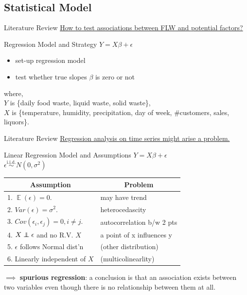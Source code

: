 \documentclass{beamer}
\newcommand\independent{\protect\mathpalette{\protect\independenT}{\perp}}
\def\independenT#1#2{\mathrel{\rlap{$#1#2$}\mkern2mu{#1#2}}}
\begin{document}
\subsection{Statistical Model}
\begin{frame}{Literature Review}
    \underline{How to test associations between FLW and potential factors?}
    \begin{block}{Regression Model and Strategy}
        \centering$Y = X\beta + \epsilon$\\
        \begin{itemize}
            \item set-up regression model
            \item test whether true slopes $\beta$ is zero or not
        \end{itemize}
    \end{block}
    where,\\
        $Y$ is \{daily food waste, liquid waste, solid waste\},\\
        $X$ is \{temperature, humidity, precipitation, day of week, \#customers, sales, liquors\}.
\end{frame}

\begin{frame}{Literature Review}
    \underline{Regression analysis on time series might arise a problem.}
    \begin{block}{Linear Regression Model and Assumptions}
        \centering $Y = X\beta + \epsilon$\\
        \centering $\epsilon \overset{\text{i.i.d.}}{\sim} N(0, \sigma^2)$
        \small
        \begin{tabular}{ll}
            \hline
            \multicolumn{1}{c}{Assumption} & \multicolumn{1}{c}{Problem}    \\ \hline
            1. $\mathop{\mathbb{E}}(\epsilon) = 0.$ & may have trend  \\
            2. $Var(\epsilon) = \sigma^2.$& heterocedascity                \\
            3. $Cov(\epsilon_i,\epsilon_j) = 0, i\neq j.$& autocorrelation b/w 2 pts \\
            4. $X \independent \epsilon$ and no R.V. $X$ & a point of x influences y      \\
            5. $\epsilon$ follows Normal dist'n & (other distribution)           \\
            6. Linearly independent of $X$ & (multicolinearlity)            \\ \hline
            \end{tabular}  
    \end{block}   
    $\implies$ \textbf{spurious regression}: a conclusion is that an association exists between two variables even though there is no relationship between them at all.
\end{frame}
\end{document}
